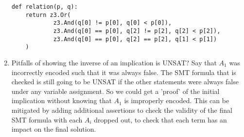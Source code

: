 \begin{enumerate}[label=(\alph*)]
    \begin{verbatim}
def relation(p, q):
    return z3.Or(
            z3.And(q[0] != p[0], q[0] < p[0]),
            z3.And(q[0] == p[0], q[2] != p[2], q[2] < p[2]),
            z3.And(q[0] == p[0], q[2] == p[2], q[1] < p[1])
    )
    \end{verbatim}

  \item {\color{blue}Pitfalls of showing the inverse of an implication is UNSAT?}
    Say that $A_1$ was incorrectly encoded such that it was always false. The SMT formula that is checked is still going to be UNSAT if the other statements were always false under any variable assignment. So we could get a 'proof' of the initial implication without knowing that $A_1$ is improperly encoded. This can be mitigated by adding additional assertions to check the validity of the final SMT formula with each $A_i$ dropped out, to check that each term has an impact on the final solution.
\end{enumerate}

